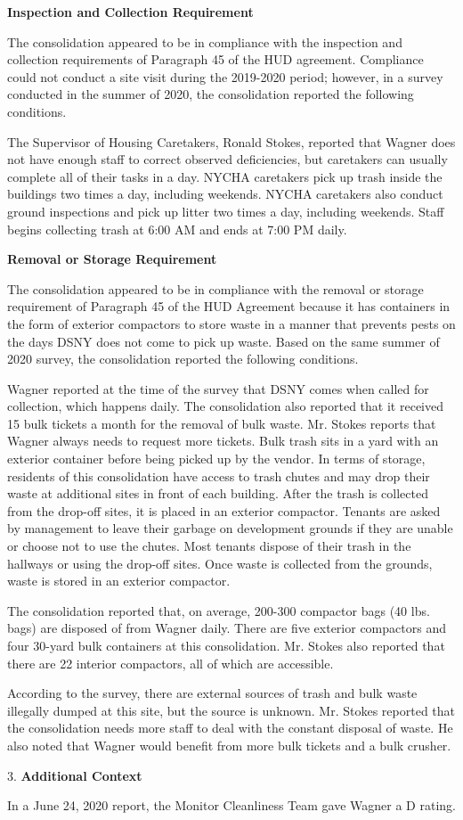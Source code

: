 

\textbf{Inspection and Collection Requirement}

The consolidation appeared to be in compliance with the inspection and collection requirements of Paragraph 45 of the HUD agreement. Compliance could not conduct a site visit during the 2019-2020 period; however, in a survey conducted in the summer of 2020, the consolidation reported the following conditions.

The Supervisor of Housing Caretakers, Ronald Stokes, reported that Wagner does not have enough staff to correct observed deficiencies, but caretakers can usually complete all of their tasks in a day. NYCHA caretakers pick up trash inside the buildings two times a day, including weekends. NYCHA caretakers also conduct ground inspections and pick up litter two times a day, including weekends. Staff begins collecting trash at 6:00 AM and ends at 7:00 PM daily. 

\textbf{Removal or Storage Requirement}

The consolidation appeared to be in compliance with the  removal or storage requirement of Paragraph  45 of the HUD Agreement because it has containers in the form of exterior compactors to store waste in a manner that prevents pests on the days DSNY does not come to pick up waste. Based on the same summer of  2020 survey, the consolidation reported the following conditions.

Wagner reported at the time of the survey that DSNY comes when called for collection, which happens daily. The consolidation also reported that it received 15 bulk tickets a month for the removal of bulk waste. Mr. Stokes reports that Wagner always needs to request more tickets. Bulk trash sits in a yard with an exterior container before being picked up by the vendor. In terms of storage, residents of this consolidation have access to trash chutes and may drop their waste at additional sites in front of each building. After the trash is collected from the drop-off sites, it is placed in an exterior compactor. Tenants are asked by management to leave their garbage on development grounds if they are unable or choose not to use the chutes. Most tenants dispose of their trash in the hallways or using the drop-off sites. Once waste is collected from the grounds, waste is stored in an exterior compactor. 

The consolidation reported that, on average, 200-300 compactor bags (40 lbs. bags) are disposed of from Wagner daily. There are five exterior compactors and four 30-yard bulk containers at this consolidation. Mr. Stokes also reported that there are 22 interior compactors, all of which are accessible. 

According to the survey, there are external sources of trash and bulk waste illegally dumped at this site, but the source is unknown. Mr. Stokes reported that the consolidation needs more staff to deal with the constant disposal of waste. He also noted that Wagner would benefit from more bulk tickets and a bulk crusher.

3. \textbf{Additional Context} 

In a June 24, 2020 report, the Monitor Cleanliness Team gave Wagner a D rating. 